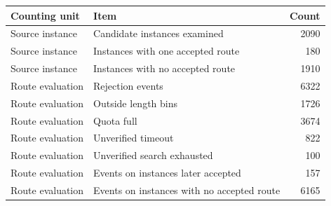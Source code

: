 \begin{tabular}{llr}
\hline
Counting unit & Item & Count \\
\hline
Source instance & Candidate instances examined & 2090 \\
Source instance & Instances with one accepted route & 180 \\
Source instance & Instances with no accepted route & 1910 \\
Route evaluation & Rejection events & 6322 \\
Route evaluation & Outside length bins & 1726 \\
Route evaluation & Quota full & 3674 \\
Route evaluation & Unverified timeout & 822 \\
Route evaluation & Unverified search exhausted & 100 \\
Route evaluation & Events on instances later accepted & 157 \\
Route evaluation & Events on instances with no accepted route & 6165 \\
\hline
\end{tabular}

